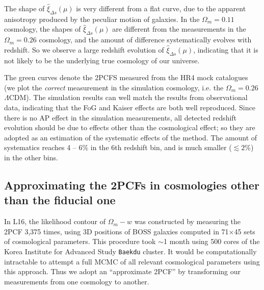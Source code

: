\documentclass[iop]{emulateapj}
\begin{document}
The shape of $\hat \xi_{\Delta s}(\mu)$ is very different from a flat curve, 
due to the apparent anisotropy produced by the peculiar motion of galaxies.
In the $\Omega_m=0.11$ cosmology, 
the shapes of $\hat\xi_{\Delta s}(\mu)$ are different from the measurements in the $\Omega_m=0.26$ cosmology,
and the amount of difference systematically evolves with redshift.
So we observe a large redshift evolution of $\hat\xi_{\Delta s}(\mu)$, 
indicating that it is not likely to be the underlying true cosmology of our universe.

The green curves denote the 2PCFS measured from the HR4 mock catalogues
(we plot the {\it correct} measurement in the simulation cosmology, i.e. the $\Omega_m=0.26$ $\Lambda$CDM).
The simulation results can well match the results from observational data,
indicating that the FoG \citep{FOG} and Kaiser \citep{Kaiser1987} effects are both well reproduced.
Since there is no AP effect in the simulation measurements,
all detected redshift evolution should be due to effects other than the cosmological effect; 
so they are adopted as an estimation of the systematic effects of the method.
The amount of systematics reaches 4 -- 6\% in the 6th redshift bin,
and is much smaller ($\lesssim2\%$) in the other bins.



\subsection{Approximating the 2PCFs in cosmologies other than the fiducial one}\label{sec:approx_2pcf}

In L16, the likelihood contour of $\Omega_m - w$ was constructed by
measuring the 2PCF 3,375 times,
using 3D positions of BOSS galaxies computed in 71$\times$45 sets of cosmological parameters.
This procedure took $\sim$1 month using 500 cores of the Korea Institute for Advanced Study {\texttt {Baekdu}} cluster.
It would be computationally intractable to attempt a full MCMC of all relevant cosmological parameters using this approach. 
Thus we adopt an ``approximate 2PCF'' by transforming our measurements from one cosmology to another.
\end{document}
